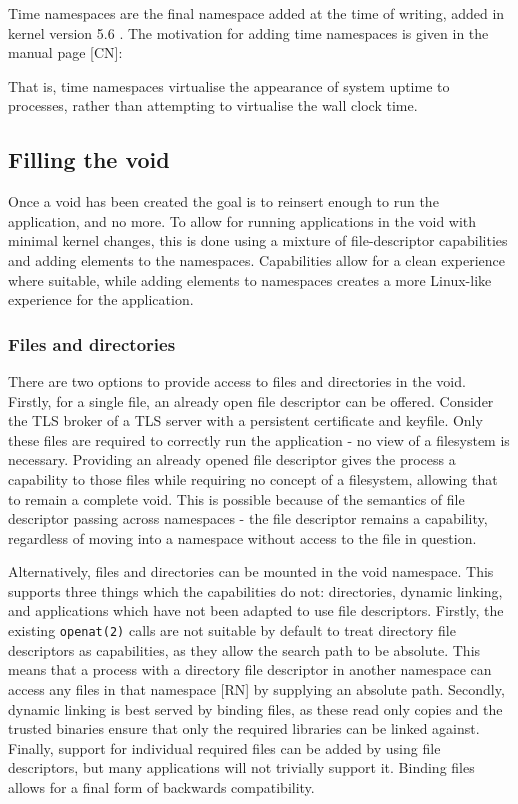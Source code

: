 \documentclass[sigplan]{acmart}
\begin{document}
Time namespaces are the final namespace added at the time of writing, added in kernel version 5.6 \citep{noauthor_linux_2020}. The motivation for adding time namespaces is given in the manual page [CN]:


That is, time namespaces virtualise the appearance of system uptime to processes, rather than attempting to virtualise the wall clock time.

\subsection{Filling the void}

Once a void has been created the goal is to reinsert enough to run the application, and no more. To allow for running applications in the void with minimal kernel changes, this is done using a mixture of file-descriptor capabilities and adding elements to the namespaces. Capabilities allow for a clean experience where suitable, while adding elements to namespaces creates a more Linux-like experience for the application.

\subsubsection{Files and directories} There are two options to provide access to files and directories in the void. Firstly, for a single file, an already open file descriptor can be offered. Consider the TLS broker of a TLS server with a persistent certificate and keyfile. Only these files are required to correctly run the application - no view of a filesystem is necessary. Providing an already opened file descriptor gives the process a capability to those files while requiring no concept of a filesystem, allowing that to remain a complete void. This is possible because of the semantics of file descriptor passing across namespaces - the file descriptor remains a capability, regardless of moving into a namespace without access to the file in question.

Alternatively, files and directories can be mounted in the void namespace. This supports three things which the capabilities do not: directories, dynamic linking, and applications which have not been adapted to use file descriptors. Firstly, the existing \texttt{openat(2)} calls are not suitable by default to treat directory file descriptors as capabilities, as they allow the search path to be absolute. This means that a process with a directory file descriptor in another namespace can access any files in that namespace [RN] by supplying an absolute path. Secondly, dynamic linking is best served by binding files, as these read only copies and the trusted binaries ensure that only the required libraries can be linked against. Finally, support for individual required files can be added by using file descriptors, but many applications will not trivially support it. Binding files allows for a final form of backwards compatibility.
\end{document}
